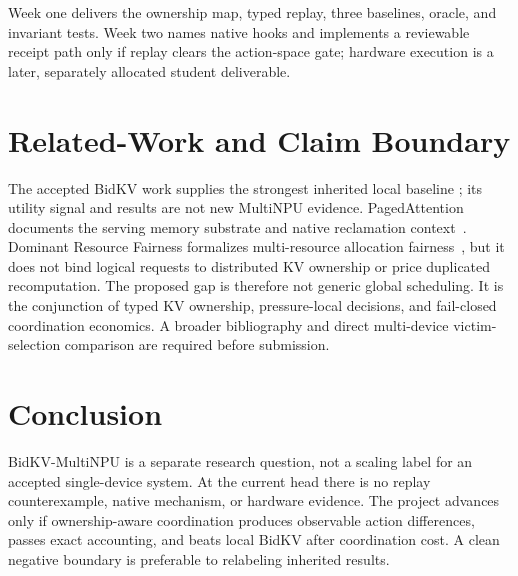 \documentclass[10pt]{article}
\begin{document}
Week one delivers the ownership map, typed replay, three baselines, oracle, and
invariant tests.  Week two names native hooks and implements a reviewable receipt
path only if replay clears the action-space gate; hardware execution is a later,
separately allocated student deliverable.

\section{Related-Work and Claim Boundary}
The accepted BidKV work supplies the strongest inherited local baseline
\cite{BidKV2026}; its utility signal and results are not new MultiNPU evidence.
PagedAttention documents the serving memory substrate and native reclamation
context~\cite{Kwon2023}.  Dominant Resource Fairness formalizes multi-resource
allocation fairness~\cite{Ghodsi2011}, but it does not bind logical requests to
distributed KV ownership or price duplicated recomputation.  The proposed gap
is therefore not generic global scheduling.  It is the conjunction of typed KV
ownership, pressure-local decisions, and fail-closed coordination economics.
A broader bibliography and direct multi-device victim-selection comparison are
required before submission.

\section{Conclusion}
BidKV-MultiNPU is a separate research question, not a scaling label for an
accepted single-device system.  At the current head there is no replay
counterexample, native mechanism, or hardware evidence.  The project advances
only if ownership-aware coordination produces observable action differences,
passes exact accounting, and beats local BidKV after coordination cost.  A clean
negative boundary is preferable to relabeling inherited results.



\end{document}
